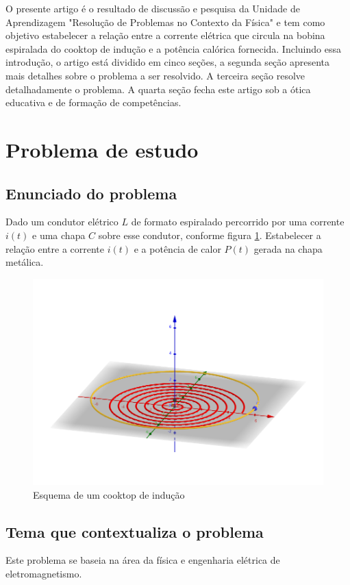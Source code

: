 \documentclass[
	article,			%
	11pt,				%
	oneside,			%
	a4paper,			%
	english,			%
	brazil,				%
	sumario=tradicional
	]{abntex2}
\begin{document}
O presente artigo é o resultado de discussão e pesquisa da Unidade de Aprendizagem "Resolução de Problemas no Contexto da Física" e tem como objetivo estabelecer a relação entre a corrente elétrica que circula na bobina espiralada do cooktop de indução e a potência calórica fornecida. Incluindo essa introdução, o artigo está dividido em cinco seções, a segunda seção apresenta mais detalhes sobre o problema a ser resolvido. A terceira seção resolve detalhadamente o problema. A quarta seção fecha este artigo sob a ótica educativa e de formação de competências.

\section{Problema de estudo}

\subsection{Enunciado do problema}

Dado um condutor elétrico $ L $ de formato espiralado percorrido por uma corrente $ i(t) $ e uma chapa $ C $ sobre esse condutor, conforme figura \ref{fig:esquema}. Estabelecer a relação entre a corrente $ i(t) $ e a potência de calor $ P(t) $ gerada na chapa metálica.

\begin{figure}[h]
	\centering
	\includegraphics[width=0.7\linewidth]{figures/fig1}
	\caption[Esquema de um cooktop de indução]{Esquema de um cooktop de indução}
	\label{fig:esquema}
\end{figure}

\subsection{Tema que contextualiza o problema}

Este problema se baseia na área da física e engenharia elétrica de eletromagnetismo.
\end{document}
